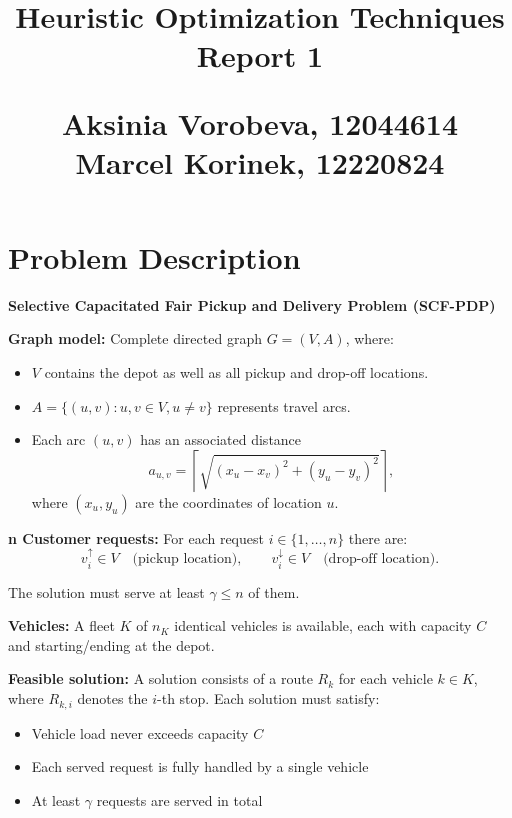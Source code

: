 \documentclass[12pt]{article}
\title{\vspace{2cm}
    \Huge \textbf{Heuristic Optimization Techniques}\\[2cm]
    \LARGE Report 1
    \vspace{10cm}
    
    \large Aksinia Vorobeva, 12044614  \\ Marcel Korinek, 12220824
    }
\begin{document}
\maketitle


\pagebreak

\section{Problem Description}
\begin{mdframed}[
    linecolor=black,
    linewidth=1.5pt,
    roundcorner=5pt,
    backgroundcolor=blue!5,
    userdefinedwidth=\textwidth,
]
\textbf{Selective Capacitated Fair Pickup and Delivery Problem (SCF-PDP)}

\vspace{0.7em}
\textbf{Graph model:}  
Complete directed graph $G = (V, A)$, where:
\begin{itemize}
    \item $V$ contains the depot as well as all pickup and drop-off locations.
    \item $A = \{(u,v) : u, v \in V, u \neq v\}$ represents travel arcs.
    \item Each arc $(u,v)$ has an associated distance  
    \[
        a_{u,v} = \left\lceil \sqrt{(x_u - x_v)^2 + (y_u - y_v)^2} \right\rceil,
    \]
    where $(x_u, y_u)$ are the coordinates of location $u$.
\end{itemize}

\vspace{0.5em}
\textbf{n Customer requests:}   
For each request $i \in \{1, \dots, n\}$ there are:
\[
v_i^{\uparrow} \in V \quad \text{(pickup location)}, \qquad
v_i^{\downarrow} \in V \quad \text{(drop-off location)}.
\]

The solution must serve at least $\gamma \le n$ of them.

\vspace{0.5em}
\textbf{Vehicles:}  
A fleet $K$ of $n_K$ identical vehicles is available, each with capacity $C$ and starting/ending at the depot.

\vspace{0.7em}
\textbf{Feasible solution:}  
A solution consists of a route $R_k$ for each vehicle $k \in K$, where $R_{k,i}$ denotes the $i$-th stop. Each solution must satisfy:
\begin{itemize}
    \item Vehicle load never exceeds capacity $C$
    \item Each served request is fully handled by a single vehicle
    \item At least $\gamma$ requests are served in total
\end{itemize}


\end{mdframed}
\end{document}
